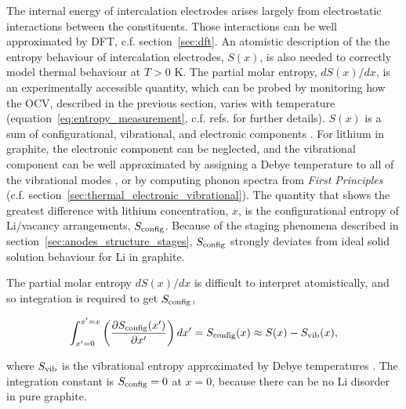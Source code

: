 \documentclass[../main.tex]{subfiles}
\begin{document}
The internal energy of intercalation electrodes arises largely from electrostatic interactions between the constituents. Those interactions can be well approximated by DFT, c.f. section~\ref{sec:dft}. An atomistic description of the the entropy behaviour of intercalation electrodes, $S(x)$, is also needed to correctly model thermal behaviour at $T>0$ K. The partial molar entropy, $dS(x)/dx$, is an experimentally accessible quantity, which can be probed by monitoring how the OCV, described in the previous section, varies with temperature (equation~\ref{eq:entropy_measurement}, c.f. refs.  for further details). $S(x)$ is a sum of configurational, vibrational, and electronic components \cite{REYNIER2003850,Reynier2004}. For lithium in graphite, the electronic component can be neglected, and the vibrational component can be well approximated by assigning a Debye temperature to all of the vibrational modes \cite{REYNIER2003850,Reynier2004}, or by computing phonon spectra from \textit{First Principles} \cite{hazrati_li_2014} (c.f. section~\ref{sec:thermal_electronic_vibrational}). The quantity that shows the greatest difference with lithium concentration, $x$, is the configurational entropy of Li/vacancy arrangements, $S_{\rm{config}}$. Because of the staging phenomena described in section~\ref{sec:anodes_structure_stages}, $S_{\rm{config}}$ strongly deviates from ideal solid solution behaviour for Li in graphite.

The partial molar entropy $dS(x)/dx$ is difficult to interpret atomistically, and so integration is required to get $S_{\rm{config}}$,

\begin{equation}
    \int_{x'=0}^{x'=x} \left(\frac{{\partial}S_{\rm{config}}(x')}{{\partial}x'}\right)dx' = S_{\rm{config}}(x) \approx S(x) - S_{\rm{vib}}(x),
    \label{eq:entropy_integration}
\end{equation}

where $S_{\rm{vib}}$ is the vibrational entropy approximated by Debye temperatures  \cite{REYNIER2003850,Reynier2004}. The integration constant is $S_{\rm{config}} = 0$ at $x=0$, because there can be no Li disorder in pure graphite. 
\end{document}

